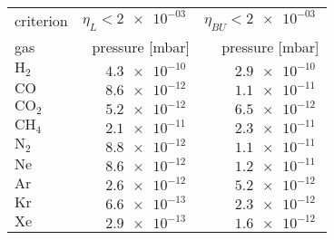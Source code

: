%
\begin{tabular}[b]{@{} l r r @{}}
  \toprule
    criterion &   $\eta_{L} < \SI{2e-03}{}$ &   $\eta_{BU} < \SI{2e-03}{}$  \\
		gas       &   pressure [mbar]           &   pressure [mbar]             \\
	\midrule
	  $\mathrm{H_{2}}$  &   $\SI{4.3e-10}{}$ &    $\SI{2.9e-10}{}$ \\
	  $\mathrm{CO}$     &   $\SI{8.6e-12}{}$ &    $\SI{1.1e-11}{}$ \\
		$\mathrm{CO_{2}}$ &   $\SI{5.2e-12}{}$ &    $\SI{6.5e-12}{}$ \\
		$\mathrm{CH_{4}}$ &   $\SI{2.1e-11}{}$ &    $\SI{2.3e-11}{}$ \\
		$\mathrm{N_{2}}$  &   $\SI{8.8e-12}{}$ &    $\SI{1.1e-11}{}$ \\
		$\mathrm{Ne}$     &   $\SI{8.6e-12}{}$ &    $\SI{1.2e-11}{}$ \\
		$\mathrm{Ar}$     &   $\SI{2.6e-12}{}$ &    $\SI{5.2e-12}{}$ \\
		$\mathrm{Kr}$     &   $\SI{6.6e-13}{}$ &    $\SI{2.3e-12}{}$ \\
		$\mathrm{Xe}$     &   $\SI{2.9e-13}{}$ &    $\SI{1.6e-12}{}$ \\
  \bottomrule
\end{tabular}
